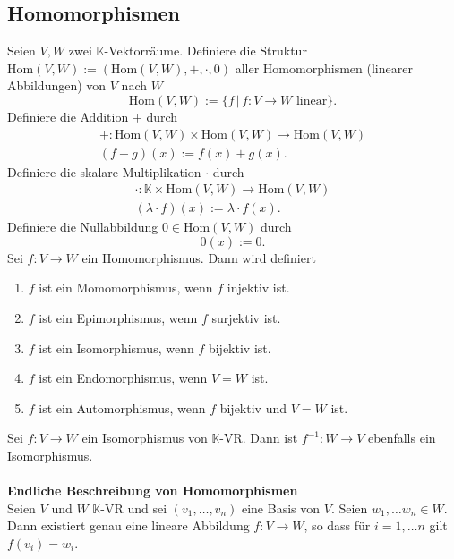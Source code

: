 \documentclass[a4paper,12pt]{article}
\numberwithin{equation}{section}
\begin{document}
\subsection{Homomorphismen}
Seien $V,W$ zwei $\mathbb{K}$-Vektorräume. Definiere die Struktur $\text{Hom}\left(V,W\right):=\left(\text{Hom}\left(V,W\right),+,\cdot ,0\right)$ aller Homomorphismen (linearer Abbildungen) von $V$ nach $W$
\[ 
        \text{Hom}\left(V,W\right):=\{f\,|\, f:V\rightarrow W\text{ linear}\}
.\] 
Definiere die Addition $+$ durch
\begin{gather*}
        +:\text{Hom}\left(V,W\right)\times \text{Hom}\left(V,W\right)\rightarrow \text{Hom}\left(V,W\right)\\
        \left(f+g\right)\left(x\right):=f\left(x\right)+g\left(x\right)
.\end{gather*}
Definiere die skalare Multiplikation $\cdot $ durch
\begin{gather*}
        \cdot :\mathbb{K}\times \text{Hom}\left(V,W\right)\rightarrow \text{Hom}\left(V,W\right)\\
        \left(\lambda \cdot f\right)\left(x\right):=\lambda \cdot f\left(x\right)
.\end{gather*}
Definiere die Nullabbildung $0 \in \text{Hom}\left(V,W\right)$ durch
\[ 
        0\left(x\right):=0
.\] 
Sei $f:V\rightarrow W$ ein Homomorphismus. Dann wird definiert
\begin{enumerate}[label=\arabic*]
        \item $f$ ist ein Momomorphismus, wenn $f$ injektiv ist.
        \item $f$ ist ein Epimorphismus, wenn $f$ surjektiv ist.
        \item $f$ ist ein Isomorphismus, wenn $f$ bijektiv ist.
        \item $f$ ist ein Endomorphismus, wenn $V=W$ ist.
        \item $f$ ist ein Automorphismus, wenn $f$ bijektiv und $V=W$ ist.
\end{enumerate}
Sei $f:V\rightarrow W$ ein Isomorphismus von $\mathbb{K}$-VR. Dann ist $f^{-1}:W\rightarrow V$ ebenfalls ein Isomorphismus.
\\\hfill\\\textbf{Endliche Beschreibung von Homomorphismen}\\ 
Seien $V$ und $W$ $\mathbb{K}$-VR und sei $\left(v_1,\hdots ,v_n\right)$ eine Basis von $V$. Seien $w_1,\hdots w_n  \in W$. Dann existiert genau eine lineare Abbildung $f:V\rightarrow W$, so dass für $i=1,\hdots n$ gilt $f\left(v_i\right)=w_i$.
\end{document}
